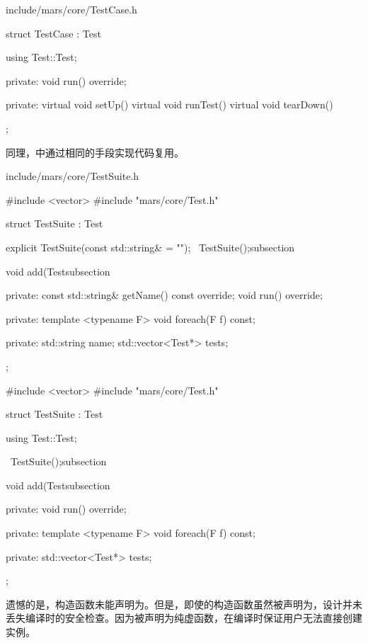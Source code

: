 \begin{content}
\begin{diff}{include/mars/core/TestCase.h}
\begin{minicpp}
struct TestCase : Test {
  using Test::Test;

private:
  void run() override;

private:
  virtual void setUp() {}
  virtual void runTest() {}
  virtual void tearDown() {}
};
 \end{minicpp}
\end{diff}

同理，中通过相同的手段实现代码复用。

\begin{diff}{include/mars/core/TestSuite.h}
 \begin{minicpp}
#include <vector>
#include "mars/core/Test.h"

struct TestSuite : Test {
  explicit TestSuite(const std::string& = "");
  ~TestSuite();subsection

  void add(Testsubsection

private:
  const std::string& getName() const override;
  void run() override;

private:
  template <typename F>
  void foreach(F f) const;

private:
  std::string name;
  std::vector<Test*> tests;
};
 \end{minicpp}
\tcblower
 \begin{minicpp}
#include <vector>
#include "mars/core/Test.h"

struct TestSuite : Test {
  using Test::Test;

  ~TestSuite();subsection

  void add(Testsubsection

private:
  void run() override;

private:
  template <typename F>
  void foreach(F f) const;

private:
  std::vector<Test*> tests;
};
 \end{minicpp}
\end{diff}

遗憾的是，构造函数未能声明为。但是，即使的构造函数虽然被声明为，设计并未丢失编译时的安全检查。因为被声明为纯虚函数，在编译时保证用户无法直接创建实例。

\end{content}

